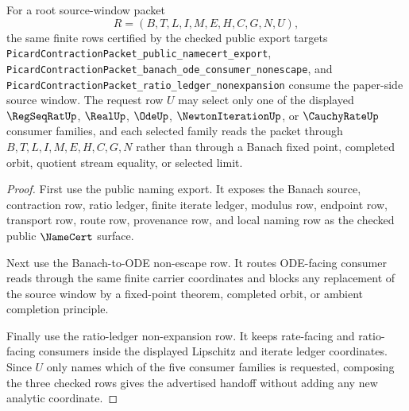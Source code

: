 \begin{theorem}
\label{thm:picardcontraction-root-source-window-checked-handoff}
For a root source-window packet
$$
R=(B,T,L,I,M,E,H,C,G,N,U),
$$
the same finite rows certified by the checked public export targets
\texttt{PicardContractionPacket\_public\_namecert\_export},
\texttt{PicardContractionPacket\_banach\_ode\_consumer\_nonescape}, and
\texttt{PicardContractionPacket\_ratio\_ledger\_nonexpansion} consume the paper-side source window. The request row $U$ may select only one of the displayed $\RegSeqRatUp$, $\RealUp$, $\OdeUp$, $\NewtonIterationUp$, or $\CauchyRateUp$ consumer families, and each selected family reads the packet through $B,T,L,I,M,E,H,C,G,N$ rather than through a Banach fixed point, completed orbit, quotient stream equality, or selected limit.
\end{theorem}
\begin{proof}
First use the public naming export. It exposes the Banach source, contraction row, ratio ledger, finite iterate ledger, modulus row, endpoint row, transport row, route row, provenance row, and local naming row as the checked public $\NameCert$ surface.

Next use the Banach-to-ODE non-escape row. It routes ODE-facing consumer reads through the same finite carrier coordinates and blocks any replacement of the source window by a fixed-point theorem, completed orbit, or ambient completion principle.

Finally use the ratio-ledger non-expansion row. It keeps rate-facing and ratio-facing consumers inside the displayed Lipschitz and iterate ledger coordinates. Since $U$ only names which of the five consumer families is requested, composing the three checked rows gives the advertised handoff without adding any new analytic coordinate.
\end{proof}

